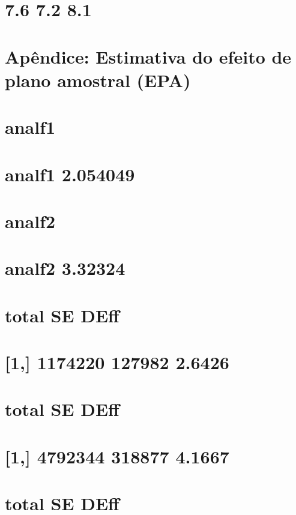 \documentclass[]{book}
\theoremstyle{definition}
\theoremstyle{definition}
\theoremstyle{definition}
\theoremstyle{remark}
\begin{document}
\section{7.6 7.2 8.1}\label{section-7}

\section{Apêndice: Estimativa do efeito de plano amostral
(EPA)}\label{apendice-estimativa-do-efeito-de-plano-amostral-epa}

\section{analf1}\label{analf1}

\section{analf1 2.054049}\label{analf1-2.054049}

\section{analf2}\label{analf2}

\section{analf2 3.32324}\label{analf2-3.32324}

\section{total SE DEff}\label{total-se-deff-2}

\section{{[}1,{]} 1174220 127982 2.6426}\label{section-8}

\section{total SE DEff}\label{total-se-deff-3}

\section{{[}1,{]} 4792344 318877 4.1667}\label{section-9}

\section{total SE DEff}\label{total-se-deff-4}
\end{document}
